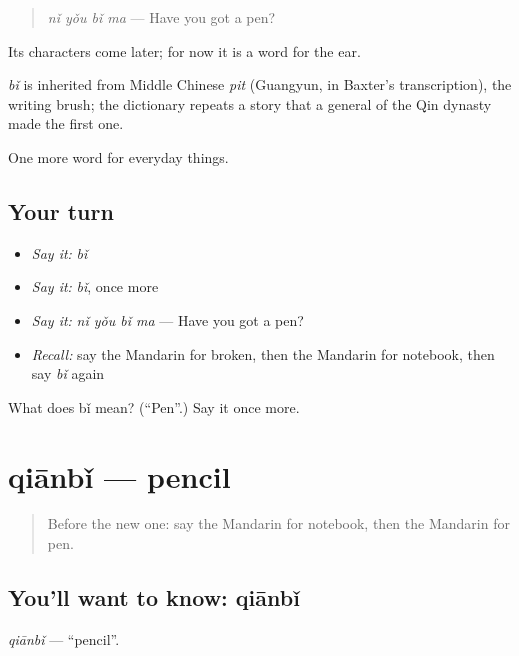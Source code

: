 \begin{quote}
\emph{nǐ yǒu bǐ ma} — Have you got a pen?
\end{quote}

Its characters come later; for now it is a word for the ear.

\begin{cousinweb}
\emph{bǐ} is inherited from Middle Chinese \emph{pit} (Guangyun, in Baxter's transcription), the writing brush; the dictionary repeats a story that a general of the Qin dynasty made the first one.
\end{cousinweb}

\begin{grammarlens}[title={What you've built}]
One more word for everyday things.
\end{grammarlens}

\subsection*{Your turn}
\begin{itemize}
\raggedright
  \item \emph{Say it:} \emph{bǐ}
  \item \emph{Say it:} \emph{bǐ}, once more
  \item \emph{Say it:} \emph{nǐ yǒu bǐ ma} — Have you got a pen?
  \item \emph{Recall:} say the Mandarin for broken, then the Mandarin for notebook, then say \emph{bǐ} again
\end{itemize}

\begin{tcolorbox}[breakable,colback=teal!4,colframe=teal!35!black,title={Before you move on}]
What does bǐ mean? (\textquotedblleft{}Pen\textquotedblright{}.) Say it once more.
\end{tcolorbox}
\section[qiānbǐ]{qiānbǐ — pencil}

\label{lesson:ZH-C104-qianbi}



\begin{quote}
Before the new one: say the Mandarin for notebook, then the Mandarin for pen.
\end{quote}

\subsection*{You'll want to know: qiānbǐ}
\emph{qiānbǐ} — \textquotedblleft{}pencil\textquotedblright{}.


